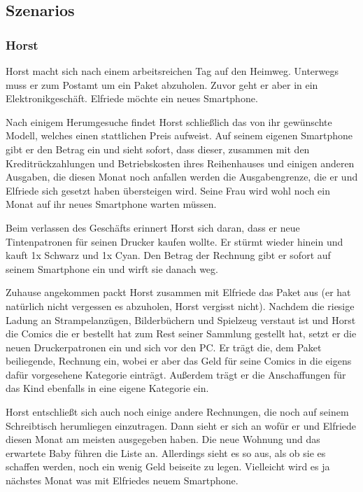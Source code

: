 \subsection{Szenarios}

\subsubsection{Horst}

Horst macht sich nach einem arbeitsreichen Tag auf den Heimweg. Unterwegs muss er zum
Postamt um ein Paket abzuholen. Zuvor geht er aber in ein Elektronikgesch\"aft.
Elfriede m\"ochte ein neues Smartphone.

Nach einigem Herumgesuche findet Horst schlie\ss lich das von ihr gew\"unschte
Modell, welches einen stattlichen Preis aufweist. Auf seinem eigenen
Smartphone gibt er den Betrag ein und sieht sofort, dass dieser, zusammen
mit den Kreditr\"uckzahlungen und Betriebskosten ihres Reihenhauses und
einigen anderen Ausgaben, die diesen Monat noch anfallen werden die
Ausgabengrenze, die er und Elfriede sich gesetzt haben \"ubersteigen wird.
Seine Frau wird wohl noch ein Monat auf ihr neues Smartphone warten
m\"ussen.

Beim verlassen des Gesch\"afts erinnert Horst sich daran, dass er neue
Tintenpatronen für seinen Drucker kaufen wollte. Er st\"urmt wieder hinein
und kauft 1x Schwarz und 1x Cyan. Den Betrag der Rechnung gibt er sofort
auf seinem Smartphone ein und wirft sie danach weg.

Zuhause angekommen packt Horst zusammen mit Elfriede das Paket aus (er hat
nat\"urlich nicht vergessen es abzuholen, Horst vergisst nicht). Nachdem die
riesige Ladung an Strampelanz\"ugen, Bilderb\"uchern und Spielzeug verstaut
ist und Horst die Comics die er bestellt hat zum Rest seiner Sammlung
gestellt hat, setzt er die neuen Druckerpatronen ein und sich vor den PC.
Er tr\"agt die, dem Paket beiliegende, Rechnung ein, wobei er aber das Geld
für seine Comics in die eigens daf\"ur vorgesehene Kategorie eintr\"agt.
Au\ss erdem tr\"agt er die Anschaffungen für das Kind ebenfalls in eine eigene
Kategorie ein.

Horst entschlie\ss t sich auch noch einige andere Rechnungen, die noch auf
seinem Schreibtisch herumliegen einzutragen. Dann sieht er sich an wof\"ur er
und Elfriede diesen Monat am meisten ausgegeben haben. Die neue Wohnung und
das erwartete Baby f\"uhren die Liste an. Allerdings sieht es so aus, als ob
sie es schaffen werden, noch ein wenig Geld beiseite zu legen. Vielleicht
wird es ja n\"achstes Monat was mit Elfriedes neuem Smartphone.

